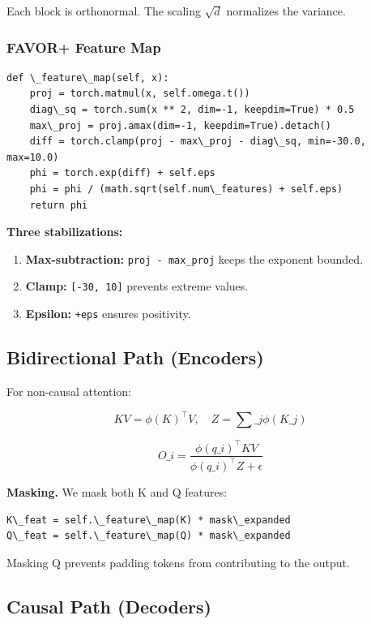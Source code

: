 Each block is orthonormal. The scaling $\sqrt{d}$ normalizes the variance.

\subsubsection{FAVOR+ Feature Map}

\begin{lstlisting}
def \_feature\_map(self, x):
    proj = torch.matmul(x, self.omega.t())
    diag\_sq = torch.sum(x ** 2, dim=-1, keepdim=True) * 0.5
    max\_proj = proj.amax(dim=-1, keepdim=True).detach()
    diff = torch.clamp(proj - max\_proj - diag\_sq, min=-30.0, max=10.0)
    phi = torch.exp(diff) + self.eps
    phi = phi / (math.sqrt(self.num\_features) + self.eps)
    return phi
\end{lstlisting}

\textbf{Three stabilizations:}
\begin{enumerate}
\item \textbf{Max-subtraction:} \texttt{proj - max\_proj} keeps the exponent bounded.
\item \textbf{Clamp:} \texttt{[-30, 10]} prevents extreme values.
\item \textbf{Epsilon:} \texttt{+eps} ensures positivity.

\end{enumerate}
\subsection{Bidirectional Path (Encoders)}

For non-causal attention:

\[
KV = \phi(K)^\top V, \quad Z = \sum\_j \phi(K\_j)
\tag{4.1}
\]

\[
O\_i = \frac{\phi(q\_i)^\top KV}{\phi(q\_i)^\top Z + \epsilon}
\tag{4.2}
\]

\textbf{Masking.} We mask both K and Q features:

\begin{lstlisting}
K\_feat = self.\_feature\_map(K) * mask\_expanded
Q\_feat = self.\_feature\_map(Q) * mask\_expanded
\end{lstlisting}

Masking Q prevents padding tokens from contributing to the output.

\subsection{Causal Path (Decoders)}

